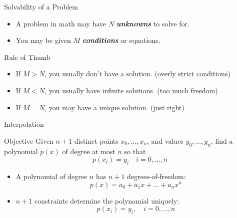 \documentclass[10pt]{beamer}
\begin{document}

\begin{frame}{Solvability of a Problem}
\begin{itemize}
    \item A problem in math may have $N$ \textbf{\textit{unknowns}} to solve for.\bigskip

    \item You may be given $M$ \textbf{\textit{conditions}} or equations. 

\end{itemize}
\begin{block}{Rule of Thumb}
\begin{itemize}
    \item If $M>N$, you usually don't have a solution. (overly strict conditions)
    \item If $M<N$, you usually have infinite solutions. (too much freedom)
    \item If $M=N$, you may have a unique solution. (just right)
\end{itemize}    
\end{block}
\end{frame}
\begin{frame}{Interpolation}
  \begin{block}{Objective}
    Given $n+1$ distinct points $x_0,\dots,x_n$, and values
$y_0,\dots,y_n$, find a polynomial $p(x)$ of degree at most $n$ so that
  \begin{equation*}
    p(x_i) = y_i\quad i=0,\dots,n
\end{equation*}
  \end{block}
\begin{itemize}
  \item A polynomial of degree $n$ has $n+1$ degrees-of-freedom:
\begin{equation*}
  p(x) = a_0 + a_1 x + \dots + a_n x^n
\end{equation*}
\item $n+1$ constraints determine the polynomial uniquely:
\begin{equation*}
  p(x_i) = y_i, \quad i=0,\dots,n
\end{equation*}
\end{itemize}


\end{frame}
\end{document}
